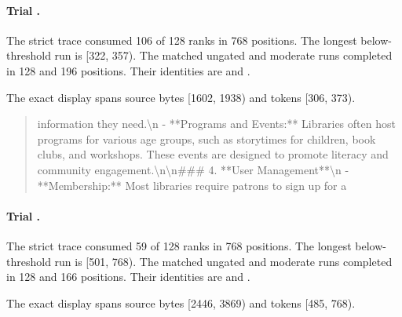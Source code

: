 \paragraph{Trial .}

The strict trace consumed 106 of 128 ranks in 768 positions. The longest below-threshold run is [322, 357). The matched ungated and moderate runs completed in 128 and 196 positions. Their identities are  and .

The exact display spans source bytes [1602, 1938) and tokens [306, 373).

\begin{quote}\small  information they need.\textbackslash{}n   - **Programs and Events:** Libraries often host programs for various age groups, such as storytimes for children, book clubs, and workshops. These events are designed to promote literacy and community engagement.\textbackslash{}n\textbackslash{}n\#\#\# 4. **User Management**\textbackslash{}n   - **Membership:** Most libraries require patrons to sign up for a\end{quote}

\paragraph{Trial .}

The strict trace consumed 59 of 128 ranks in 768 positions. The longest below-threshold run is [501, 768). The matched ungated and moderate runs completed in 128 and 166 positions. Their identities are  and .

The exact display spans source bytes [2446, 3869) and tokens [485, 768).

